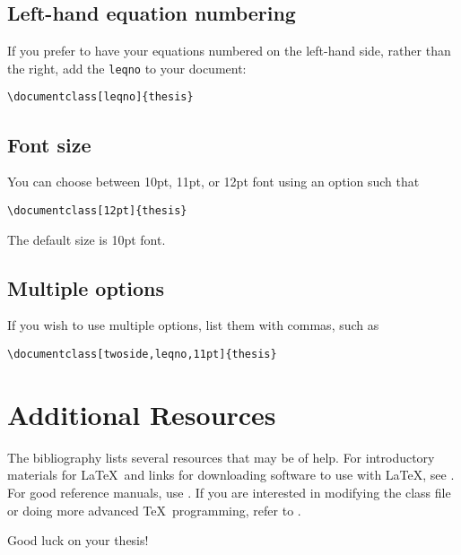 \documentclass[12pt]{thesis}
\begin{document}
\section{Left-hand equation numbering}
If you prefer to have your equations numbered on the left-hand side, rather than the right, add the \texttt{leqno} to your document:
\begin{verbatim}
\documentclass[leqno]{thesis}
\end{verbatim}

\section{Font size}
You can choose between 10pt, 11pt, or 12pt font using an option such that
\begin{verbatim}
\documentclass[12pt]{thesis}
\end{verbatim}
The default size is 10pt font.

\section{Multiple options}
If you wish to use multiple options, list them with commas, such as
\begin{verbatim}
\documentclass[twoside,leqno,11pt]{thesis}
\end{verbatim}

\chapter{Additional Resources}
The bibliography lists several resources that may be of help. For introductory materials for \LaTeX\ and links for downloading software to use with \LaTeX, see \cite{computation-page}. For good reference manuals, use \cite{lamport, goossens, kopka-daly}. If you are interested in modifying the class file or doing more advanced \TeX\ programming, refer to \cite{knuth}.

Good luck on your thesis!

\appendix




\printindex
\end{document}
